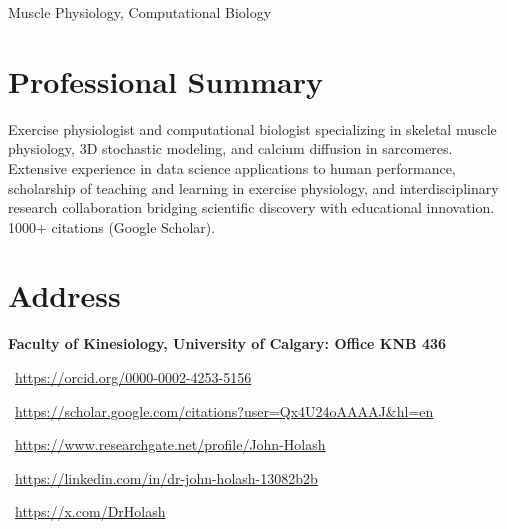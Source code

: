 \documentclass[]{friggeri-cv}
\begin{document}
      {Muscle Physiology, Computational Biology}
   

\section{Professional Summary}
Exercise physiologist and computational biologist specializing in skeletal muscle physiology, 3D stochastic modeling, and calcium diffusion in sarcomeres. Extensive experience in data science applications to human performance, scholarship of teaching and learning in exercise physiology, and interdisciplinary research collaboration bridging scientific discovery with educational innovation. 1000+ citations (Google Scholar).\section{Address}
\textbf{Faculty of Kinesiology, University of Calgary: Office KNB 436} %
    
\faOrcid\ \url{https://orcid.org/0000-0002-4253-5156}

\faGoogle\ \url{https://scholar.google.com/citations?user=Qx4U24oAAAAJ&hl=en}

\faResearchgate\ \url{https://www.researchgate.net/profile/John-Holash}

\faLinkedin\ \url{https://linkedin.com/in/dr-john-holash-13082b2b}

\faTwitter\ \url{https://x.com/DrHolash}
\end{document}
